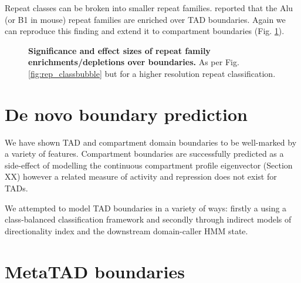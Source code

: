\documentclass[a4paper,10pt,oneside]{book}
\begin{document}
Repeat classes can be broken into smaller repeat families. \citet{Dixon2012} reported that the Alu (or B1 in mouse) repeat families are enriched over TAD boundaries. Again we can reproduce this finding and extend it to compartment boundaries (Fig. \ref{fig:rep_fambubble}). 

\begin{figure}
\begin{center} 
\captionsetup{width=\textwidth}
\caption{ {\bf Significance and effect sizes of repeat family enrichments/depletions over boundaries.}
As per Fig. \ref{fig:rep_classbubble} but for a higher resolution repeat classification.
}\label{fig:rep_fambubble}
\end{center}
\end{figure} 


\section{De novo boundary prediction}

We have shown TAD and compartment domain boundaries to be well-marked by a variety of features. Compartment boundaries are successfully predicted as a side-effect of modelling the continuous compartment profile eigenvector (Section XX) however a related measure of activity and repression does not exist for TADs.

We attempted to model TAD boundaries in a variety of ways: firstly a using a class-balanced classification framework and secondly through indirect models of directionality index and the downstream domain-caller HMM state.\cite{Dixon2012}

\section{MetaTAD boundaries}
\end{document}
